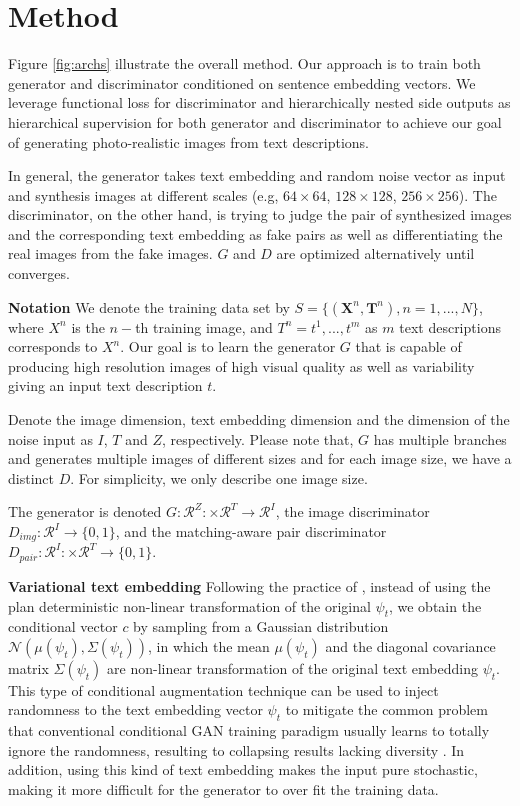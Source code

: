 \documentclass[10pt,twocolumn,letterpaper]{article}
\begin{document}
\section{Method}
Figure \ref{fig:archs} illustrate the overall method.
Our approach is to train both generator and discriminator conditioned on sentence embedding vectors. We leverage functional loss for discriminator and hierarchically nested side outputs as hierarchical supervision for both generator and discriminator to achieve our goal of generating photo-realistic images from text descriptions.  

In general, the generator takes text embedding and random noise vector as input and synthesis images at different scales (e.g, $64\times64$, $128\times128$, $256\times256$). The discriminator, on the other hand, is trying to judge the pair of synthesized images and the corresponding text embedding as fake pairs as well as differentiating the real images from the fake images. $G$ and $D$ are optimized alternatively until converges.


\textbf{Notation } 
We denote the training data set by $S=\{(\bm{X}^n, \bm{T}^n),n=1,...,N\}$, where $X^n$ is the $n-$th training image, and $T^n={t^1,...,t^m}$ as $m$ text descriptions corresponds to $X^n$. Our goal is to learn the generator $G$ that is capable of producing high resolution images of high visual quality as well as variability giving an input text description $t$.  

Denote the image dimension, text embedding dimension and the dimension of the noise input as $I$, $T$ and $Z$, respectively. Please note that, $G$ has multiple branches and generates multiple images of different sizes and for each image size, we have a distinct $D$. For simplicity, we only describe one image size.  

The generator is denoted $G: \mathcal{R}^{Z}: \times \mathcal{R}^{T}\rightarrow\mathcal{R}^{I}$, the image discriminator $D_{img}: \mathcal{R}^{I}\rightarrow\{0, 1\}$, and the matching-aware pair discriminator $D_{pair}: \mathcal{R}^{I}: \times \mathcal{R}^{T}\rightarrow\{0, 1\}$. 


\textbf{Variational text embedding } Following the practice of \cite{han2017stackgan}, instead of using the plan deterministic non-linear transformation of the original $\psi_t$, we obtain the conditional vector $c$ by sampling from a Gaussian distribution $\mathcal{N}(\mu(\psi_t), \Sigma(\psi_t) )$, in which the mean $\mu(\psi_t)$ and the diagonal covariance matrix $\Sigma(\psi_t)$ are non-linear transformation of the original text embedding $\psi_t$. This type of conditional augmentation technique can be used to inject randomness to the text embedding vector $\psi_t$ to mitigate the common problem that conventional conditional GAN training paradigm usually learns to totally ignore the randomness, resulting to collapsing results lacking diversity \cite{reed2016generative}. In addition, using this kind of text embedding makes the input pure stochastic, making it more difficult for the generator to over fit the training data.
\end{document}
